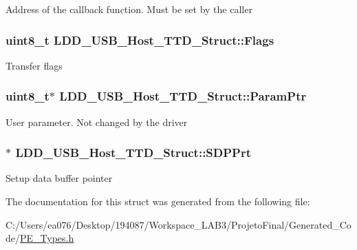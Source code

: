 Address of the callback function. Must be set by the caller \hypertarget{struct_l_d_d___u_s_b___host___t_t_d___struct_a083f54cb9e59a2206aca7d5481154c27}{
\subsubsection[{Flags}]{\setlength{\rightskip}{0pt plus 5cm}uint8\-\_\-t L\-D\-D\-\_\-\-U\-S\-B\-\_\-\-Host\-\_\-\-T\-T\-D\-\_\-\-Struct\-::\-Flags}}\label{struct_l_d_d___u_s_b___host___t_t_d___struct_a083f54cb9e59a2206aca7d5481154c27}
Transfer flags \hypertarget{struct_l_d_d___u_s_b___host___t_t_d___struct_ab6fd6fdfe1e3e43cbdb5e1f2f61b3265}{
\subsubsection[{Param\-Ptr}]{\setlength{\rightskip}{0pt plus 5cm}uint8\-\_\-t$\ast$ L\-D\-D\-\_\-\-U\-S\-B\-\_\-\-Host\-\_\-\-T\-T\-D\-\_\-\-Struct\-::\-Param\-Ptr}}\label{struct_l_d_d___u_s_b___host___t_t_d___struct_ab6fd6fdfe1e3e43cbdb5e1f2f61b3265}
User parameter. Not changed by the driver \hypertarget{struct_l_d_d___u_s_b___host___t_t_d___struct_af1881ea197419558fdb55dc5f98ee446}{
\subsubsection[{S\-D\-P\-Prt}]{$\ast$ L\-D\-D\-\_\-\-U\-S\-B\-\_\-\-Host\-\_\-\-T\-T\-D\-\_\-\-Struct\-::\-S\-D\-P\-Prt}}\label{struct_l_d_d___u_s_b___host___t_t_d___struct_af1881ea197419558fdb55dc5f98ee446}
Setup data buffer pointer 

The documentation for this struct was generated from the following file\-:\begin{DoxyCompactItemize}
\item 
C\-:/\-Users/ea076/\-Desktop/194087/\-Workspace\-\_\-\-L\-A\-B3/\-Projeto\-Final/\-Generated\-\_\-\-Code/\hyperlink{_p_e___types_8h}{P\-E\-\_\-\-Types.\-h}\end{DoxyCompactItemize}
